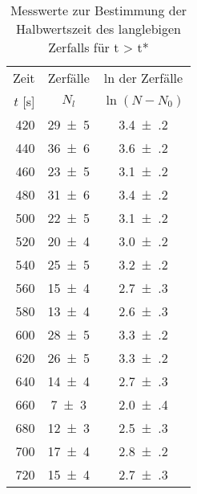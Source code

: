 \begin{table}[!h]
	\centering
	\begin{tabular}{|r|c|c|}
		\hline
		Zeit & Zerfälle & ln der Zerfälle\\
		$t$ [\si{\second}] & $N_{l}$ & $\ln(N - N_{0})$\\
\hline\hline
		\num{420} & \num{29(5)} & \num{3.4(2)}\\
		\num{440} & \num{36(6)} & \num{3.6(2)}\\
		\num{460} & \num{23(5)} & \num{3.1(2)}\\
		\num{480} & \num{31(6)} & \num{3.4(2)}\\
		\num{500} & \num{22(5)} & \num{3.1(2)}\\
		\num{520} & \num{20(4)} & \num{3.0(2)}\\
		\num{540} & \num{25(5)} & \num{3.2(2)}\\
		\num{560} & \num{15(4)} & \num{2.7(3)}\\
		\num{580} & \num{13(4)} & \num{2.6(3)}\\
		\num{600} & \num{28(5)} & \num{3.3(2)}\\
		\num{620} & \num{26(5)} & \num{3.3(2)}\\
		\num{640} & \num{14(4)} & \num{2.7(3)}\\
		\num{660} & \num{7(3)} & \num{2.0(4)}\\
		\num{680} & \num{12(3)} & \num{2.5(3)}\\
		\num{700} & \num{17(4)} & \num{2.8(2)}\\
		\num{720} & \num{15(4)} & \num{2.7(3)}\\
		\hline
	\end{tabular}
	\caption{Messwerte zur Bestimmung der Halbwertszeit des langlebigen Zerfalls für t > t* \label{tab:Auswertung_Messwerte_Rhodium_lang}}
\end{table}

